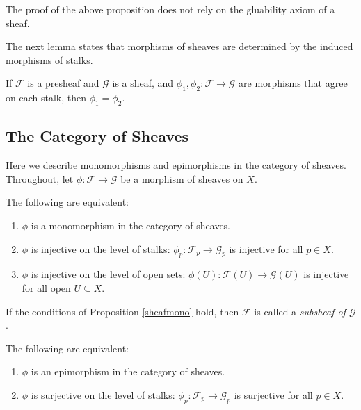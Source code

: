 \documentclass[11pt,openany]{book} %
\begin{document}
\begin{remark}
The proof of the above proposition does not rely on the gluability axiom of a sheaf.
\end{remark}

The next lemma states that morphisms of sheaves are determined by the induced morphisms of stalks.\\

\begin{lemma}
If $\mathcal{F}$ is a presheaf and $\mathcal{G}$ is a sheaf, and $\phi_1, \phi_2 : \mathcal{F} \to \mathcal{G}$ are morphisms that agree on each stalk, then $\phi_1 = \phi_2$.
\end{lemma}

\subsection{The Category of Sheaves}

Here we describe monomorphisms and epimorphisms in the category of sheaves. Throughout, let $\phi : \mathcal{F} \to \mathcal{G}$ be a morphism of sheaves on $X$.

\begin{proposition} \label{sheafmono}
The following are equivalent:
\begin{enumerate}
	\item $\phi$ is a monomorphism in the category of sheaves.
    \item $\phi$ is injective on the level of stalks: $\phi_p : \mathcal{F}_p \to \mathcal{G}_p$ is injective for all $p \in X$.
    \item $\phi$ is injective on the level of open sets: $\phi(U) : \mathcal{F}(U) \to \mathcal{G}(U)$ is injective for all open $U \subseteq X$.
\end{enumerate}
\end{proposition}

\begin{definition}
If the conditions of Proposition \ref{sheafmono} hold, then $\mathcal{F}$ is called a \emph{subsheaf of $\mathcal{G}$}.
\end{definition}

\begin{proposition} \label{sheafepi}
The following are equivalent:
\begin{enumerate}
	\item $\phi$ is an epimorphism in the category of sheaves.
    \item $\phi$ is surjective on the level of stalks: $\phi_p : \mathcal{F}_p \to \mathcal{G}_p$ is surjective for all $p \in X$.
\end{enumerate}
\end{proposition}
\end{document}
